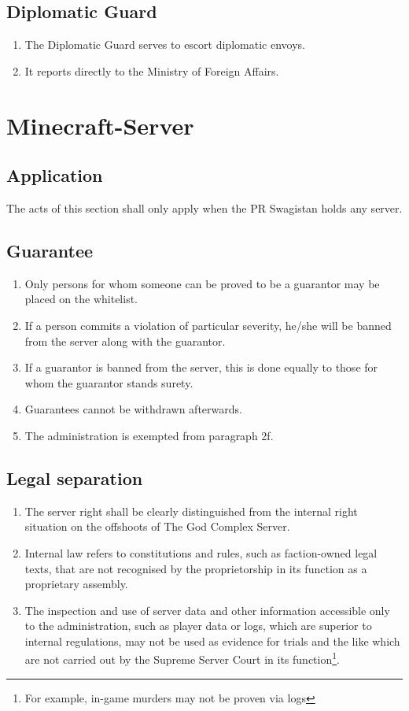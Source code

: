 \documentclass{article}
\begin{document}
\subsection{Diplomatic Guard}
\begin{enumerate}[(1)]
	\item The Diplomatic Guard serves to escort diplomatic envoys.
	\item It reports directly to the Ministry of Foreign Affairs.
\end{enumerate}

\section{Minecraft-Server}

\subsection{Application}
The acts of this section shall only apply when the PR Swagistan holds any server.

\subsection{Guarantee}
\begin{enumerate}[(1)]
	\item Only persons for whom someone can be proved to be a guarantor may be placed on the whitelist.
	\item If a person commits a violation of particular severity, he/she will be banned from the server along with the guarantor.
	\item If a guarantor is banned from the server, this is done equally to those for whom the guarantor stands surety.
	\item Guarantees cannot be withdrawn afterwards.
	\item The administration is exempted from paragraph 2f.
\end{enumerate}

\subsection{Legal separation}
\begin{enumerate}[(1)]
	\item The server right shall be clearly distinguished from the internal right situation on the offshoots of The God Complex Server.
	\item Internal law refers to constitutions and rules, such as faction-owned legal texts, that are not recognised by the proprietorship in its function as a proprietary assembly.
	\item The inspection and use of server data and other information accessible only to the administration, such as player data or logs, which are superior to internal regulations, may not be used as evidence for trials and the like which are not carried out by the Supreme Server Court in its function\footnote{For example, in-game murders may not be proven via logs}.
\end{enumerate}
\end{document}
